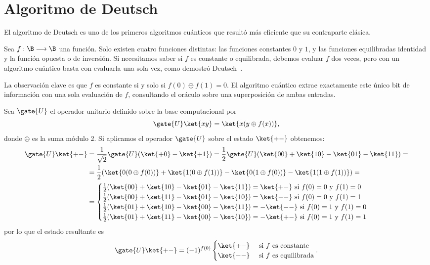 \section{Algoritmo de Deutsch}\label{sec:deutsch-algorithm}
El algoritmo de Deutsch es uno de los primeros algoritmos cuánticos que resultó más eficiente que su contraparte clásica.

Sea $f:\B\longrightarrow\B$ una función.
Solo existen cuatro funciones distintas: las funciones constantes $0$ y $1$, y las funciones equilibradas identidad y la función opuesta o de inversión.
Si necesitamos saber si $f$ es constante o equilibrada, debemos evaluar $f$ dos veces, pero con un algoritmo cuántico basta con evaluarla una sola vez, como demostró Deutsch~\cite{Deutsch1985}.

La observación clave es que $f$ es constante si y solo si $f(0)\oplus f(1)=0$.
El algoritmo cuántico extrae exactamente este único bit de información con una sola evaluación de $f$, consultando el oráculo sobre una superposición de ambas entradas.

Sea $\gate{U}$ el operador unitario definido sobre la base computacional por
\[
  \gate{U}\ket{xy}=\ket{x(y\oplus f(x))},
\]
donde $\oplus$ es la suma módulo 2.
Si aplicamos el operador $\gate{U}$ sobre el estado $\ket{+-}$ obtenemos:
\[
  \begin{split}
    \gate{U}\ket{+-} & = \frac{1}{\sqrt{2}}\gate{U}(\ket{+0}-\ket{+1})=\frac{1}{2}\gate{U}(\ket{00}+\ket{10}-\ket{01}-\ket{11})= \\
                     & = \frac{1}{2}(\ket{0(0\oplus f(0))}+\ket{1(0\oplus f(1))}-\ket{0(1\oplus f(0))}-\ket{1(1\oplus f(1))})=   \\
                     & =\begin{cases}
                          \frac{1}{2}(\ket{00}+\ket{10}-\ket{01}-\ket{11})=\ket{+-}\text{ si $f(0)=0$ y $f(1) = 0$}  \\
                          \frac{1}{2}(\ket{00}+\ket{11}-\ket{01}-\ket{10})=\ket{--}\text{ si $f(0)=0$ y $f(1) = 1$}  \\
                          \frac{1}{2}(\ket{01}+\ket{10}-\ket{00}-\ket{11})=-\ket{--}\text{ si $f(0)=1$ y $f(1) = 0$} \\
                          \frac{1}{2}(\ket{01}+\ket{11}-\ket{00}-\ket{10})=-\ket{+-}\text{ si $f(0)=1$ y $f(1) = 1$}
                        \end{cases}
  \end{split}
\]
por lo que el estado resultante es
\[
  \gate{U}\ket{+-}=(-1)^{f(0)}\begin{cases}
    \ket{+-} & \text{ si $f$ es constante}   \\
    \ket{--} & \text{ si $f$ es equilibrada}
  \end{cases}.
\]

